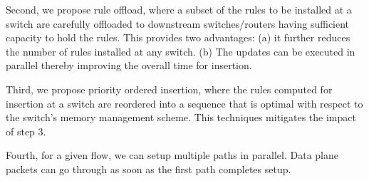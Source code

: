 \documentclass[onecolumn]{sig-alternate-10pt-onecolumn}
\begin{document}
Second, we propose rule offload, where a subset of the rules to be installed at
a switch are carefully offloaded to downstream switches/routers having
sufficient capacity to hold the rules. This provides two advantages: (a) it
further reduces the number of rules installed at any switch. (b) The updates can
be executed in parallel thereby improving the overall time for insertion. 

Third, we propose priority ordered insertion, where the rules computed for
insertion at a switch are reordered into a sequence that is optimal with respect
to the switch's memory management scheme. This techniques mitigates the impact
of step 3. 

Fourth, for a given flow, we can setup multiple paths in parallel. Data plane
packets can go through as soon as the first path completes setup.

\small


\end{document}
